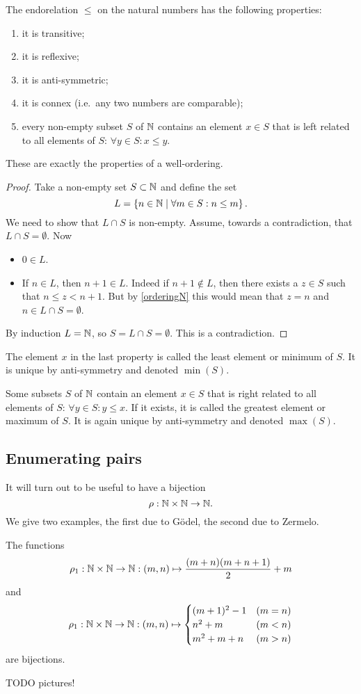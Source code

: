 \begin{proposition} \label{proposition:wellOrderingN}
The endorelation $\leq$ on the natural numbers has the following properties:
\begin{enumerate}
\item it is transitive;
\item it is reflexive;
\item it is anti-symmetric;
\item it is connex (i.e.\ any two numbers are comparable);
\item every non-empty subset $S$ of $\mathbb{N}$ contains an element $x\in S$ that is left related to all elements of $S$: $\forall y\in S: x\leq y$.
\end{enumerate}
These are exactly the properties of a well-ordering.
\end{proposition}
\begin{proof}
Take a non-empty set $S\subset \mathbb{N}$ and define the set
\[ L = \left\{ n\in\mathbb{N} \;\middle|\; \forall m\in S: n\leq m \right\}. \]
We need to show that $L\cap S$ is non-empty. Assume, towards a contradiction, that $L\cap S = \emptyset$.
Now
\begin{itemize}
\item $0\in L$.
\item If $n\in L$, then $n+1\in L$. Indeed if $n+1 \notin L$, then there exists a $z\in S$ such that $n\leq z<n+1$. But by \ref{orderingN} this would mean that $z=n$ and $n\in L\cap S = \emptyset$.
\end{itemize}
By induction $L=\mathbb{N}$, so $S = L\cap S = \emptyset$. This is a contradiction.
\end{proof}


The element $x$ in the last property is called the least element or minimum of $S$. It is unique by anti-symmetry and denoted $\min(S)$.

Some subsets $S$ of $\mathbb{N}$ contain an element $x\in S$ that is right related to all elements of $S$: $\forall y\in S: y\leq x$. If it exists, it is called the greatest element or maximum of $S$. It is again unique by anti-symmetry and denoted $\max(S)$.

\subsection{Enumerating pairs}
It will turn out to be useful to have a bijection
\[ \rho: \mathbb{N}\times \mathbb{N} \to \mathbb{N}. \]
We give two examples, the first due to Gödel, the second due to Zermelo.
\begin{lemma} \label{pairEnumeration}
The functions
\[\rho_1 : \mathbb{N}\times\mathbb{N} \to \mathbb{N}: (m,n)\mapsto \frac{(m+n)(m+n+1)}{2}+m \]
and
\[ \rho_1 : \mathbb{N}\times\mathbb{N} \to \mathbb{N}: (m,n)\mapsto \begin{cases}
(m+1)^2-1 & (m=n) \\
n^2 + m & (m<n) \\
m^2+m+n & (m>n)
\end{cases} \]
are bijections.
\end{lemma}
TODO pictures!
